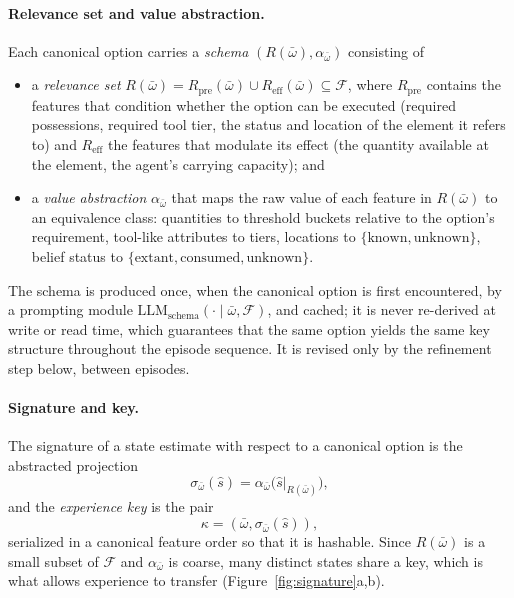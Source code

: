 \documentclass[11pt]{article}
\newcommand{\llm}[1]{\mathrm{LLM}_{\mathrm{#1}}}
\newcommand{\calF}{\mathcal{F}}
\newcommand{\Rel}{R}
\newcommand{\shat}{\hat{s}}
\begin{document}
\paragraph{Relevance set and value abstraction.}
Each canonical option carries a \emph{schema} $(\Rel(\bar\omega),\alpha_{\bar\omega})$ consisting of
\begin{itemize}[leftmargin=1.5em,itemsep=1pt]
\item a \emph{relevance set} $\Rel(\bar\omega)=\Rel_{\mathrm{pre}}(\bar\omega)\cup\Rel_{\mathrm{eff}}(\bar\omega)\subseteq\calF$, where $\Rel_{\mathrm{pre}}$ contains the features that condition whether the option can be executed (required possessions, required tool tier, the status and location of the element it refers to) and $\Rel_{\mathrm{eff}}$ the features that modulate its effect (the quantity available at the element, the agent's carrying capacity); and
\item a \emph{value abstraction} $\alpha_{\bar\omega}$ that maps the raw value of each feature in $\Rel(\bar\omega)$ to an equivalence class: quantities to threshold buckets relative to the option's requirement, tool-like attributes to tiers, locations to $\{\mathrm{known},\mathrm{unknown}\}$, belief status to $\{\mathrm{extant},\mathrm{consumed},\mathrm{unknown}\}$.
\end{itemize}
The schema is produced once, when the canonical option is first encountered, by a prompting module $\llm{schema}(\cdot\mid\bar\omega,\calF)$, and cached; it is never re-derived at write or read time, which guarantees that the same option yields the same key structure throughout the episode sequence. It is revised only by the refinement step below, between episodes.

\paragraph{Signature and key.}
The signature of a state estimate with respect to a canonical option is the abstracted projection
\begin{equation}
\sigma_{\bar\omega}(\shat)=\alpha_{\bar\omega}\big(\shat|_{\Rel(\bar\omega)}\big),
\label{eq:signature}
\end{equation}
and the \emph{experience key} is the pair
\begin{equation}
\kappa=(\bar\omega,\sigma_{\bar\omega}(\shat)),
\label{eq:key}
\end{equation}
serialized in a canonical feature order so that it is hashable. Since $\Rel(\bar\omega)$ is a small subset of $\calF$ and $\alpha_{\bar\omega}$ is coarse, many distinct states share a key, which is what allows experience to transfer (Figure~\ref{fig:signature}a,b).
\end{document}
